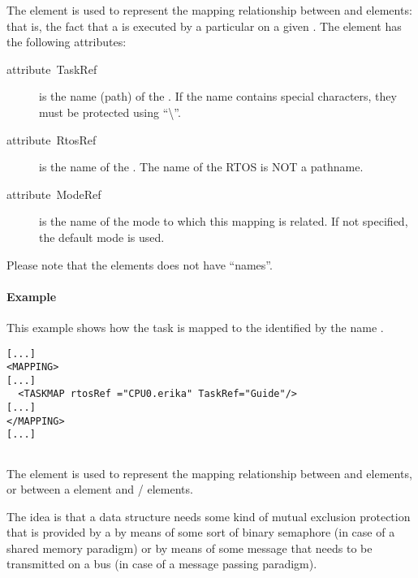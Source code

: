 The  element is used to represent the mapping
relationship between  and  elements: that is,
the fact that a  is executed by a particular 
on a given . The  element has the following
attributes:

\begin{description}
\item [{attribute~TaskRef}] is the name (path) of the . If
  the  name contains special characters, they must be
  protected using {}``\textbackslash{}''.
\item [{attribute~RtosRef}] is the name of the . The name
  of the RTOS is NOT a pathname.
\item [{attribute~ModeRef}] is the name of the mode to which this
  mapping is related. If not specified, the default mode is used.
\end{description}

Please note that the  elements does not have {}``names''.


\paragraph{Example}

This example shows how the  task is mapped to the
 identified by the name .

\begin{lstlisting}
[...]
<MAPPING>
[...]
  <TASKMAP rtosRef ="CPU0.erika" TaskRef="Guide"/>
[...]
</MAPPING>
[...]
\end{lstlisting}


\subsection{}

The  element is used to represent the mapping
relationship between  and  elements, or
between a  element and / elements.

The idea is that a data structure needs some kind of mutual exclusion
protection that is provided by a  by means of some sort of
binary semaphore (in case of a shared memory paradigm) or by means of
some message that needs to be transmitted on a bus (in case of a
message passing paradigm).

